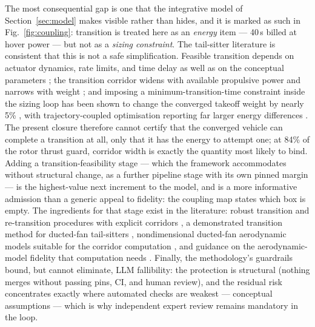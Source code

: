 The most consequential gap is one that the integrative model of
Section~\ref{sec:model} makes visible rather than hides, and it is
marked as such in Fig.~\ref{fig:coupling}: transition is treated here as
an \emph{energy} item --- 40\,s billed at hover power --- but not as a
\emph{sizing constraint}. The tail-sitter literature is consistent that
this is not a safe simplification. Feasible transition depends on
actuator dynamics, rate limits, and time delay as well as on the
conceptual parameters \citep{zhong2021,li2020,banazadeh2016}; the transition corridor
widens with available propulsive power and narrows with weight
\citep{tang2018}; and imposing a minimum-transition-time constraint
inside the sizing loop has been shown to change the converged takeoff
weight by nearly 5\% \citep{cong2024}, with trajectory-coupled
optimisation reporting far larger energy differences
\citep{kaneko2024}. The present closure therefore cannot certify that
the converged vehicle can complete a transition at all, only that it has
the energy to attempt one; at 84\% of the rotor thrust guard, corridor
width is exactly the quantity most likely to bind. Adding a
transition-feasibility stage --- which the framework accommodates
without structural change, as a further pipeline stage with its own
pinned margin --- is the highest-value next increment to the model, and
is a more informative admission than a generic appeal to fidelity: the
coupling map states which box is empty. The ingredients for that
stage exist in the literature: robust transition and re-transition
procedures with explicit corridors \citep{marvakov2021}, a
demonstrated transition method for ducted-fan tail-sitters
\citep{zhang2013}, nondimensional ducted-fan aerodynamic models
suitable for the corridor computation \citep{ohanian2012}, and
guidance on the aerodynamic-model fidelity that computation needs
\citep{anderson2021,arias2025}. Finally, the
methodology's guardrails bound, but cannot eliminate, LLM
fallibility: the protection is structural (nothing merges without
passing pins, CI, and human review), and the residual risk
concentrates exactly where automated checks are weakest ---
conceptual assumptions --- which is why independent expert review
remains mandatory in the loop.
